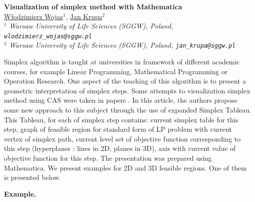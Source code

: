 \documentclass[11pt]{article}
\theoremstyle{definition}
\begin{document}
%





\vspace{-0.8cm}
\begin{flushleft}
\Large \textbf{\noindent
Visualization of simplex method with Mathematica}
\\
\vspace{0.5cm}
\normalsize
\normalsize{
\underline{ W{\l}odzimierz Wojas$^1$}, \underline{Jan Krupa}$^2$
} \\
\vspace{5mm}
\textit{\footnotesize
$^1$ Warsaw University of Life Sciences (SGGW), Poland, {\tt wlodzimierz\_wojas@sggw.pl}\\
$^2$ Warsaw University of Life Sciences (SGGW), Poland, {\tt jan\_krupa@sggw.pl}\\
}
\end{flushleft}

Simplex algorithm is taught at universities in framework of different academic courses, for example Linear Programming, Mathematical Programming or Operation Research. One aspect of the teaching of this algorithm is to present a geometric interpretation of simplex steps. Some attempts to visualization simplex method using CAS were taken in papers  \cite{Stan, Liu, Bulmer}. In this article, the authors propose some new approach to this subject through the use of expanded Simplex Tableau. This Tableau, for each of simplex step contains: current simplex table for this step, graph of feasible region for standard form of LP problem with current vertex of simplex path, current level set of objective function corresponding to this step (hyperplanes : lines in 2D, planes in 3D), axis with current value of objective function for this step. The presentation was prepared using Mathematica. We present examples for 2D and 3D feasible regions. One of them is presented below.

\quad

\noindent
{\bf Example.}
\end{document}
